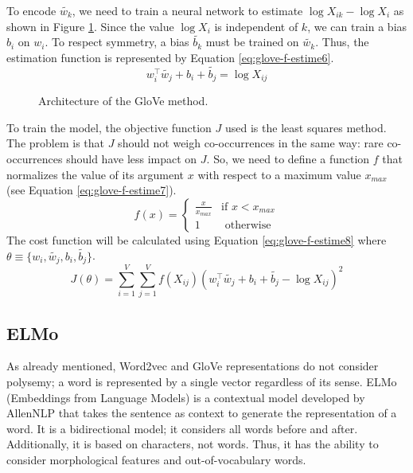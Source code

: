 \documentclass{KBook}
\begin{document}
To encode $\tilde{w_k}$, we need to train a neural network to estimate $\log X_{ik} - \log X_i$ as shown in Figure \ref{fig:glove-arch}. Since the value $\log X_i$ is independent of $k$, we can train a bias $b_i$ on $w_i$. To respect symmetry, a bias $\tilde{b_k}$ must be trained on $\tilde{w_k}$. Thus, the estimation function is represented by Equation \ref{eq:glove-f-estime6}.
\begin{equation}
	w_i^\top \tilde{w_j} + b_i + \tilde{b_j} = \log X_{ij}
	\label{eq:glove-f-estime6}
\end{equation}
\begin{figure}[ht]
	\centering
	\caption{Architecture of the GloVe method.}
	\label{fig:glove-arch}
\end{figure}

To train the model, the objective function $J$ used is the least squares method. The problem is that $J$ should not weigh co-occurrences in the same way: rare co-occurrences should have less impact on $J$. So, we need to define a function $f$ that normalizes the value of its argument $x$ with respect to a maximum value $x_{max}$ (see Equation \ref{eq:glove-f-estime7}).
\begin{equation}
	f(x) = \begin{cases}
		\frac{x}{x_{max}} & \text{if } x < x_{max} \\
		1 & \text{ otherwise}
	\end{cases}
	\label{eq:glove-f-estime7}
\end{equation}
The cost function will be calculated using Equation \ref{eq:glove-f-estime8} where $\theta \equiv \{w_i, \tilde{w_j}, b_i, \tilde{b_j}\}$.
\begin{equation}
	J(\theta) = \sum_{i=1}^{V} \sum_{j=1}^{V} f(X_{ij}) (w_i^\top \tilde{w_j} + b_i + \tilde{b_j} - \log X_{ij})^2
	\label{eq:glove-f-estime8}
\end{equation}


\subsection{ELMo}

As already mentioned, Word2vec and GloVe representations do not consider polysemy; a word is represented by a single vector regardless of its sense. ELMo (Embeddings from Language Models) is a contextual model developed by AllenNLP \cite{2018-peters-al} that takes the sentence as context to generate the representation of a word. It is a bidirectional model; it considers all words before and after. Additionally, it is based on characters, not words. Thus, it has the ability to consider morphological features and out-of-vocabulary words.
\end{document}
